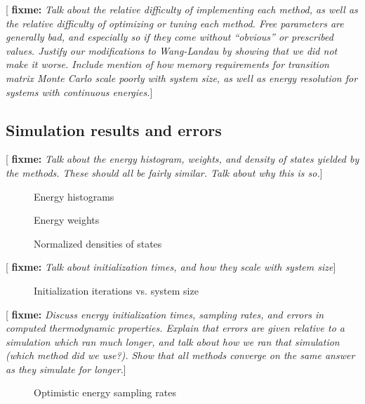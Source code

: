 \documentclass[11pt]{article}
\newcommand{\red}[1]{{\bf \color{red} #1}}
\newcommand{\fixme}[1]{[\red{fixme:} \emph{#1}]}
\begin{document}
\fixme{Talk about the relative difficulty of implementing each method,
  as well as the relative difficulty of optimizing or tuning each
  method. Free parameters are generally bad, and especially so if they
  come without ``obvious'' or prescribed values. Justify our
  modifications to Wang-Landau by showing that we did not make it
  worse. Include mention of how memory requirements for transition
  matrix Monte Carlo scale poorly with system size, as well as energy
  resolution for systems with continuous energies.}

\subsection{Simulation results and errors}
\label{sec:results_and_errors}

\fixme{Talk about the energy histogram, weights, and density of states
  yielded by the methods. These should all be fairly similar. Talk
  about why this is so.}

\begin{figure}[H]
  \centering
  \caption[Energy histograms]{Energy histograms}
  \label{fig:histograms}
\end{figure}

\begin{figure}[H]
  \centering
  \caption[Energy weights]{Energy weights}
  \label{fig:weights}
\end{figure}

\begin{figure}[H]
  \centering
  \caption[Normalized densities of states]{Normalized densities of
    states}
  \label{fig:density_of_states}
\end{figure}

\fixme{Talk about initialization times, and how they scale with system
  size}

\begin{figure}[H]
  \centering
  \caption[Initialization iterations vs. system size]{Initialization
    iterations vs. system size}
  \label{fig:scaling}
\end{figure}

\fixme{Discuss energy initialization times, sampling rates, and errors
  in computed thermodynamic properties. Explain that errors are given
  relative to a simulation which ran much longer, and talk about how
  we ran that simulation (which method did we use?). Show that all
  methods converge on the same answer as they simulate for longer.}

\begin{figure}[H]
  \centering
  \caption[Optimistic energy sampling rates]{Optimistic energy
    sampling rates}
  \label{fig:opt_sample_rate}
\end{figure}
\end{document}
